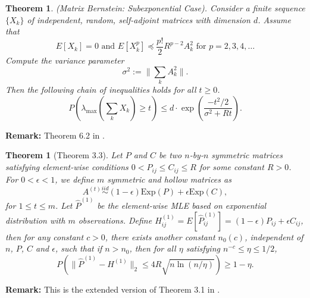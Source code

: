 \documentclass[a4paper]{article}
\newtheorem{theorem}[fact]{Theorem}
\begin{document}
\begin{theorem}
\label{thm:BernsteinMatrix}
(Matrix Bernstein: Subexponential Case). Consider a finite sequence $\{X_k\}$ of
independent, random, self-adjoint matrices with dimension $d$. Assume that
\[
	E[X_k] = 0 \text{\ \ \ and \ \ \ }  E[X_k^p] \preceq \frac{p!}{2} R^{p-2} A_k^2 \text{\ \ for } p = 2,3,4, \dots
\]
Compute the variance parameter
\[
	\sigma^2 := \|\sum_k A_k^2\|.
\]
Then the following chain of inequalities holds for all $t \ge 0$.
\[
	P \left( \lambda_{\max} \left( \sum_k X_k \right) \ge t \right) \le d \cdot \exp \left( \frac{-t^2/2}{\sigma^2 + R t} \right).
\]
\end{theorem}
\textbf{Remark:} Theorem 6.2 in \cite{tropp2012user}.








\begin{theorem}[Theorem 3.3]
\label{thm:P1Diff}
Let $P$ and $C$ be two $n$-by-$n$ symmetric matrices satisfying element-wise conditions $0 < P_{ij} \le C_{ij} \le R$ for some constant $R > 0$. For $0 < \epsilon < 1$, we define $m$ symmetric and hollow matrices as
\[
	A^{(t)} \stackrel{iid}{\sim} (1-\epsilon) \mathrm{Exp}(P) + \epsilon \mathrm{Exp}(C),
\]
for $1 \le t \le m$.
Let $\hat{P}^{(1)}$ be the element-wise MLE based on exponential distribution with $m$ observations.
Define $H_{ij}^{(1)} = E[\hat{P}_{ij}^{(1)}] = (1-\epsilon) P_{ij} + \epsilon C_{ij}$,
then for any constant $c > 0$, there exists another constant $n_0(c)$, independent of $n$, $P$, $C$ and $\epsilon$, such that if $n > n_0$, then for all $\eta$ satisfying $n^{-c} \le \eta \le 1/2$,
\[
	P \left( \| \hat{P}^{(1)} - H^{(1)} \|_2 \le 4 R \sqrt{n \ln(n/\eta)}\right) \ge 1 - \eta.
\]
\end{theorem}
\textbf{Remark:} This is the extended version of Theorem 3.1 in \cite{oliveira2009concentration}.
\end{document}
